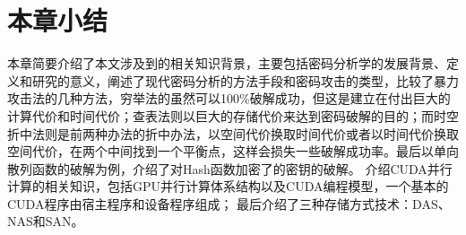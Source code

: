 \section{本章小结}
本章简要介绍了本文涉及到的相关知识背景，主要包括密码分析学的发展背景、定义和研究的意义，阐述了现代密码分析的方法手段和密码攻击的类型，比较了暴力攻击法的几种方法，穷举法的虽然可以100\%破解成功，但这是建立在付出巨大的计算代价和时间代价；查表法则以巨大的存储代价来达到密码破解的目的；而时空折中法则是前两种办法的折中办法，以空间代价换取时间代价或者以时间代价换取空间代价，在两个中间找到一个平衡点，这样会损失一些破解成功率。最后以单向散列函数的破解为例，介绍了对Hash函数加密了的密钥的破解。
介绍CUDA并行计算的相关知识，包括GPU并行计算体系结构以及CUDA编程模型，一个基本的CUDA程序由宿主程序和设备程序组成；
最后介绍了三种存储方式技术：DAS、NAS和SAN。
